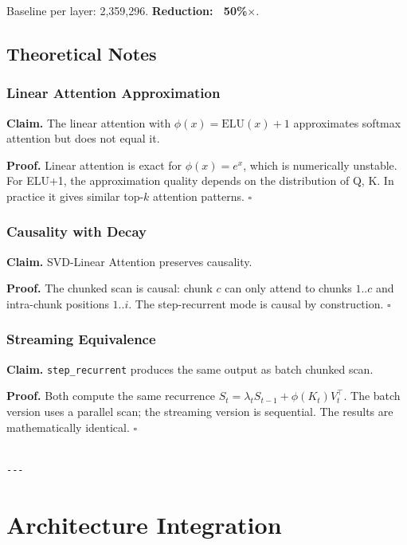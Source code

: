 Baseline per layer: 2,359,296. \textbf{Reduction: ~50\%$\times$}.

\subsection{Theoretical Notes}

\subsubsection{Linear Attention Approximation}

\textbf{Claim.} The linear attention with $\phi(x) = \text{ELU}(x) + 1$ approximates 
softmax attention but does not equal it.

\textbf{Proof.} Linear attention is exact for $\phi(x) = e^x$, which is 
numerically unstable. For ELU+1, the approximation quality depends on the 
distribution of Q, K. In practice it gives similar top-$k$ attention patterns. $\square$

\subsubsection{Causality with Decay}

\textbf{Claim.} SVD-Linear Attention preserves causality.

\textbf{Proof.} The chunked scan is causal: chunk $c$ can only attend to chunks 
$1..c$ and intra-chunk positions $1..i$. The step-recurrent mode is causal 
by construction. $\square$

\subsubsection{Streaming Equivalence}

\textbf{Claim.} \texttt{step\_recurrent} produces the same output as batch chunked scan.

\textbf{Proof.} Both compute the same recurrence $S_t = \lambda_t S_{t-1} + \phi(K_t) V_t^\top$. 
The batch version uses a parallel scan; the streaming version is sequential. 
The results are mathematically identical. $\square$
\begin{lstlisting}

---
\end{lstlisting}


\section{Architecture Integration}

